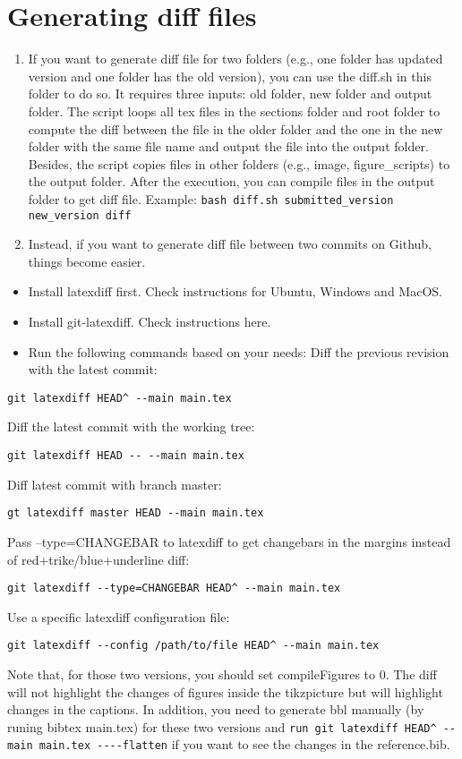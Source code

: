 \section{Generating diff files}\label{sec:diffFiles}
\begin{enumerate}
\item If you want to generate diff file for two folders (e.g., one folder has updated version and one folder has the old version), you can use the diff.sh in this folder to do so. It requires three inputs: old folder, new folder and output folder. The script loops all tex files in the sections folder and root folder to compute the diff between the file in the older folder and the one in the new folder with the same file name and output the file into the output folder. Besides, the script copies files in other folders (e.g., image, figure\_scripts) to the output folder. After the execution, you can compile files in the output folder to get diff file. Example: \verb|bash diff.sh submitted_version new_version diff|

\item Instead, if you want to generate diff file between two commits on Github, things become easier.
\end{enumerate}
\begin{itemize}
\item Install latexdiff first. Check instructions for Ubuntu, Windows and MacOS.
\item Install git-latexdiff. Check instructions here.
\item Run the following commands based on your needs: Diff the previous revision with the latest commit:
\end{itemize}

\verb|git latexdiff HEAD^ --main main.tex|

Diff the latest commit with the working tree:

\verb|git latexdiff HEAD -- --main main.tex|

Diff latest commit with branch master:

\verb|gt latexdiff master HEAD --main main.tex|

Pass --type=CHANGEBAR to latexdiff to get changebars in the margins instead of red+trike/blue+underline diff:

\verb|git latexdiff --type=CHANGEBAR HEAD^ --main main.tex|

Use a specific latexdiff configuration file:

\verb|git latexdiff --config /path/to/file HEAD^ --main main.tex|

Note that, for those two versions, you should set compileFigures to 0. The diff will not highlight the changes of figures inside the tikzpicture but will highlight changes in the captions. In addition, you need to generate bbl manually (by runing bibtex main.tex) for these two versions and \verb|run git latexdiff HEAD^ --main main.tex ----flatten| if you want to see the changes in the reference.bib.